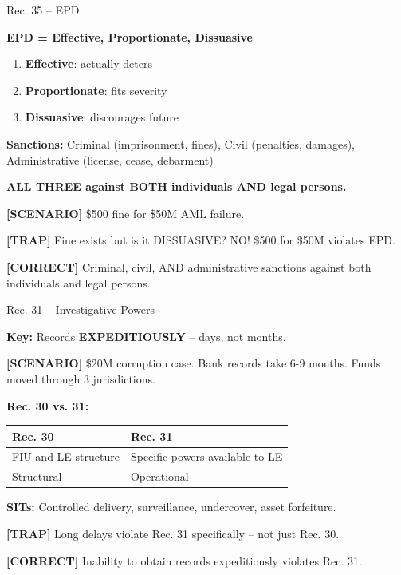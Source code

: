 \documentclass[8pt,aspectratio=169,fontsize=7pt]{beamer}
\renewcommand{\tiny}{\fontsize{4pt}{5pt}\selectfont}
\renewcommand{\normalsize}{\fontsize{8pt}{9pt}\selectfont}
\newcommand{\trap}[1]{%
	\begin{block}{\textcolor{redtrap}{\textbf{[TRAP]}}}
		\textcolor{redtrap}{\tiny #1}
	\end{block}
}
\newcommand{\scenario}[1]{%
	\begin{block}{\textbf{[SCENARIO]}}
		\tiny #1
	\end{block}
}
\newcommand{\correct}[1]{%
	\begin{block}{\textcolor{greencorrect}{\textbf{[CORRECT]}}}
		\textcolor{greencorrect}{\tiny #1}
	\end{block}
}
\begin{document}
	\begin{frame}{\normalsize Rec. 35 -- EPD}
		
		\textbf{EPD = Effective, Proportionate, Dissuasive}
		\begin{enumerate}
			\item \textbf{Effective}: actually deters
			\item \textbf{Proportionate}: fits severity
			\item \textbf{Dissuasive}: discourages future
		\end{enumerate}
		
		\textbf{Sanctions:} Criminal (imprisonment, fines), Civil (penalties, damages), Administrative (license, cease, debarment)
		
		\textbf{ALL THREE against BOTH individuals AND legal persons.}
		
		\scenario{\$500 fine for \$50M AML failure.}
		
		\trap{Fine exists but is it DISSUASIVE? NO! \$500 for \$50M violates EPD.}
		
		\correct{Criminal, civil, AND administrative sanctions against both individuals and legal persons.}
	\end{frame}
	
	\begin{frame}{\normalsize Rec. 31 -- Investigative Powers}
		
		\textbf{Key:} Records \textbf{EXPEDITIOUSLY} -- days, not months.
		
		\scenario{\$20M corruption case. Bank records take 6-9 months. Funds moved through 3 jurisdictions.}
		
		\textbf{Rec. 30 vs. 31:}
		\begin{table}
			\begin{tabular}{|p{3.5cm}|p{4cm}|}
				\hline
				\textbf{Rec. 30} & \textbf{Rec. 31} \\
				\hline
				FIU and LE structure & Specific powers available to LE \\
				\hline
				Structural & Operational \\
				\hline
			\end{tabular}
		\end{table}
		
		\textbf{SITs:} Controlled delivery, surveillance, undercover, asset forfeiture.
		
		\trap{Long delays violate Rec. 31 specifically -- not just Rec. 30.}
		
		\correct{Inability to obtain records expeditiously violates Rec. 31.}
	\end{frame}
	
\end{document}
